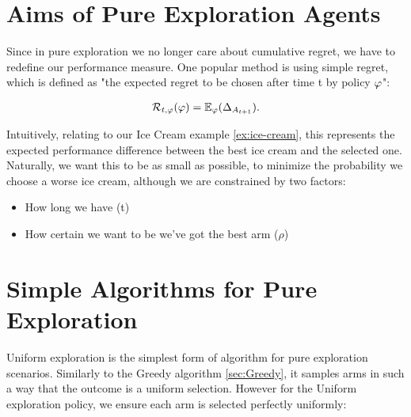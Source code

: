 \section{Aims of Pure Exploration Agents}
\label{sec:simpleregret}

Since in pure exploration we no longer care about cumulative regret, we have to redefine our performance measure. One popular method is using simple regret, which is defined as "the expected regret to be chosen after time t by policy $\varphi$":

\begin{align}
\mathcal{R}_{t, \varphi}(\varphi) = \mathbb{E}_{\varphi}(\Delta_{A_{t+1}}).
\end{align}

Intuitively, relating to our Ice Cream example \ref{ex:ice-cream}, this represents the expected performance difference between the best ice cream and the selected one. Naturally, we want this to be as small as possible, to minimize the probability we choose a worse ice cream, although we are constrained by two factors:

\begin{itemize}
    \item How long we have (t)
    \item How certain we want to be we've got the best arm ($\rho$)
\end{itemize}

\section{Simple Algorithms for Pure Exploration}

Uniform exploration is the simplest form of algorithm for pure exploration scenarios. Similarly to the Greedy algorithm \ref{sec:Greedy}, it samples arms in such a way that the outcome is a uniform selection. However for the Uniform exploration policy, we ensure each arm is selected perfectly uniformly:


